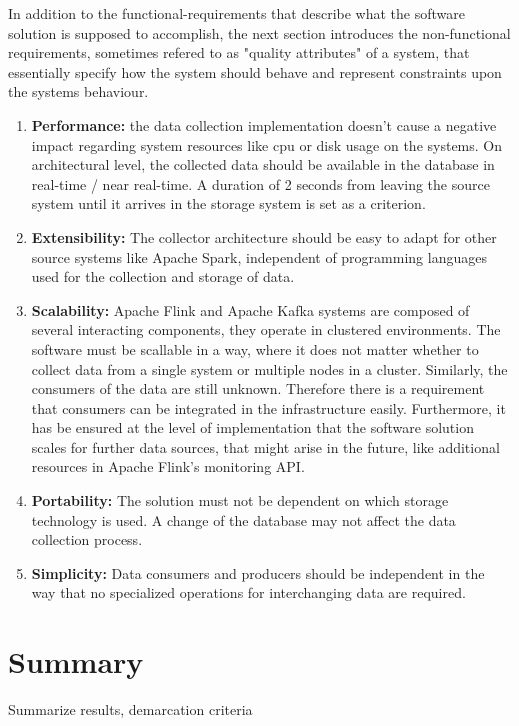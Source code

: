 In addition to the functional-requirements that describe what the software solution is supposed
to accomplish, the next section introduces the non-functional requirements, sometimes refered to as
"quality attributes" of a system, that essentially specify how the system should behave and represent
constraints upon the systems behaviour.

\begin{enumerate}
    \item \textbf{Performance:} the data collection implementation doesn't cause a negative impact regarding
    system resources like cpu or disk usage on the systems. On architectural level, the collected data should be
    available in the database in real-time / near real-time. A duration of 2 seconds from leaving the source system until
    it arrives in the storage system is set as a criterion.

    \item \textbf{Extensibility:} The collector architecture should be easy to adapt for other source systems
    like Apache Spark, independent of programming languages used for the collection and storage of data.

    \item \textbf{Scalability:} Apache Flink and Apache Kafka systems are composed of several interacting components, they
    operate in clustered environments. The software must be scallable in a way, where it does not matter whether to collect
    data from a single system or multiple nodes in a cluster. Similarly, the consumers of the data are still unknown. Therefore
    there is a requirement that consumers can be integrated in the infrastructure easily.
    Furthermore, it has be ensured at the level of implementation that the software solution scales for further data sources,
    that might arise in the future, like additional resources in Apache Flink's monitoring API.

    \item \textbf{Portability:} The solution must not be dependent on which storage technology is used. A change of the
    database may not affect the data collection process.

    \item \textbf{Simplicity:} Data consumers and producers should be independent in the way that no specialized operations
    for interchanging data are required.

\end{enumerate}

\section{Summary}

Summarize results, demarcation criteria